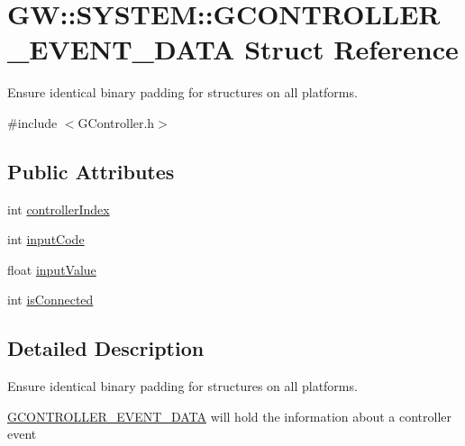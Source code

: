 \hypertarget{struct_g_w_1_1_s_y_s_t_e_m_1_1_g_c_o_n_t_r_o_l_l_e_r___e_v_e_n_t___d_a_t_a}{}\section{GW\+:\+:S\+Y\+S\+T\+EM\+:\+:G\+C\+O\+N\+T\+R\+O\+L\+L\+E\+R\+\_\+\+E\+V\+E\+N\+T\+\_\+\+D\+A\+TA Struct Reference}
\label{struct_g_w_1_1_s_y_s_t_e_m_1_1_g_c_o_n_t_r_o_l_l_e_r___e_v_e_n_t___d_a_t_a}


Ensure identical binary padding for structures on all platforms.  




{\ttfamily \#include $<$G\+Controller.\+h$>$}

\subsection*{Public Attributes}
\begin{DoxyCompactItemize}
\item 
int \mbox{\hyperlink{struct_g_w_1_1_s_y_s_t_e_m_1_1_g_c_o_n_t_r_o_l_l_e_r___e_v_e_n_t___d_a_t_a_afe34a20f1171d42f67fa364174f49864}{controller\+Index}}
\item 
int \mbox{\hyperlink{struct_g_w_1_1_s_y_s_t_e_m_1_1_g_c_o_n_t_r_o_l_l_e_r___e_v_e_n_t___d_a_t_a_a0b8f01eefbd8fdb0b11da6bef3ba6e5d}{input\+Code}}
\item 
float \mbox{\hyperlink{struct_g_w_1_1_s_y_s_t_e_m_1_1_g_c_o_n_t_r_o_l_l_e_r___e_v_e_n_t___d_a_t_a_a919e5866e08ed8a84c4157c272045217}{input\+Value}}
\item 
int \mbox{\hyperlink{struct_g_w_1_1_s_y_s_t_e_m_1_1_g_c_o_n_t_r_o_l_l_e_r___e_v_e_n_t___d_a_t_a_a75772bfa2f01fe8408ffec36be9f0c70}{is\+Connected}}
\end{DoxyCompactItemize}


\subsection{Detailed Description}
Ensure identical binary padding for structures on all platforms. 

\mbox{\hyperlink{struct_g_w_1_1_s_y_s_t_e_m_1_1_g_c_o_n_t_r_o_l_l_e_r___e_v_e_n_t___d_a_t_a}{G\+C\+O\+N\+T\+R\+O\+L\+L\+E\+R\+\_\+\+E\+V\+E\+N\+T\+\_\+\+D\+A\+TA}} will hold the information about a controller event 

